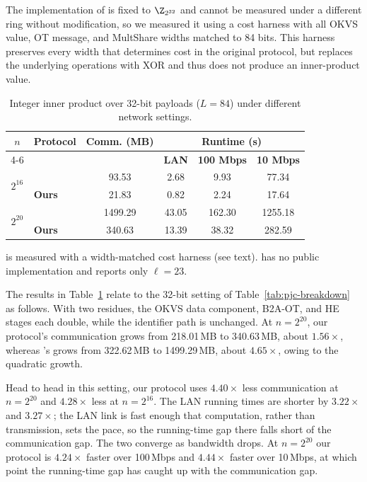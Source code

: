 The implementation of \cite{KLS26} is fixed to $\Z_{2^{32}}$ and cannot
be measured under a different ring without modification, so we measured
it using a cost harness with all OKVS value, OT message, and MultShare
widths matched to 84 bits. This harness preserves every width that
determines cost in the original protocol, but replaces the underlying
operations with XOR and thus does not produce an inner-product value.

\begin{table}[!htbp]
\centering
\caption{Integer inner product over 32-bit payloads ($L=84$) under different network settings.}
\label{tab:pjc-long}
\setlength{\tabcolsep}{3.4pt}
\renewcommand{\arraystretch}{1.05}
\small
\begin{tabular}{c l c c c c}
\toprule
\multirow{2}{*}{$n$} & \multirow{2}{*}{\textbf{Protocol}} & \multirow{2}{*}{\textbf{Comm. (MB)}} & \multicolumn{3}{c}{\textbf{Runtime (s)}} \\
\cmidrule(lr){4-6}
& & & \textbf{LAN} & \textbf{100 Mbps} & \textbf{10 Mbps} \\
\midrule
\multirow{2}{*}{$2^{16}$}
& \cite{KLS26} & 93.53 & 2.68 & 9.93 & 77.34 \\
& \textbf{Ours} & 21.83 & 0.82 & 2.24 & 17.64 \\
\midrule
\multirow{2}{*}{$2^{20}$}
& \cite{KLS26} & 1499.29 & 43.05 & 162.30 & 1255.18 \\
& \textbf{Ours} & 340.63 & 13.39 & 38.32 & 282.59 \\
\bottomrule
\end{tabular}
\vspace{2pt}
\begin{minipage}{0.95\linewidth}
\footnotesize
\cite{KLS26} is measured with a width-matched cost harness (see text).
\cite{CHI+23} has no public implementation and reports only $\ell=23$.
\end{minipage}
\end{table}

The results in Table~\ref{tab:pjc-long} relate to the 32-bit setting of
Table~\ref{tab:pjc-breakdown} as follows. With two residues, the OKVS
data component, B2A-OT, and HE stages each double, while the identifier
path is unchanged. At $n=2^{20}$, our protocol's communication grows
from 218.01\,MB to 340.63\,MB, about $1.56\times$, whereas
\cite{KLS26}'s grows from 322.62\,MB to 1499.29\,MB, about $4.65\times$,
owing to the quadratic growth.
 
Head to head in this setting, our protocol uses $4.40\times$ less
communication at $n=2^{20}$ and $4.28\times$ less at $n=2^{16}$. The LAN
running times are shorter by $3.22\times$ and $3.27\times$; the LAN link is
fast enough that computation, rather than transmission, sets the pace, so
the running-time gap there falls short of the communication gap. The two
converge as bandwidth drops. At $n=2^{20}$ our protocol is $4.24\times$
faster over 100\,Mbps and $4.44\times$ faster over 10\,Mbps, at which point
the running-time gap has caught up with the communication gap.
